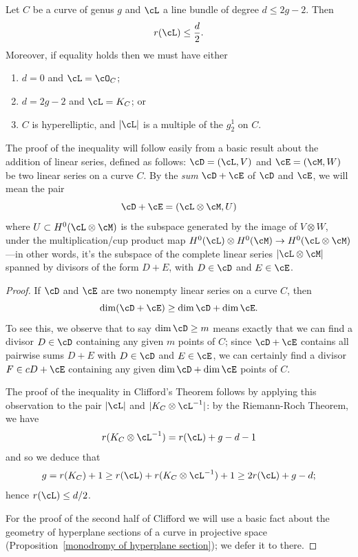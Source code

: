 \begin{theorem}\label{Clifford}
Let $C$ be a curve of genus $g$ and $\cL$ a line bundle of degree $d \leq 2g-2$. Then
$$
r(\cL) \leq \frac{d}{2}.
$$
Moreover, if  equality holds then we must have either
\begin{enumerate}
\item $d=0$ and $\cL = \cO_C$;
\item $d = 2g-2$ and $\cL = K_C$; or
\item $C$ is hyperelliptic, and $|\cL|$ is a multiple of the $g^1_2$ on $C$.
\end{enumerate}
\end{theorem}

The proof of the inequality will follow easily from a basic result about the addition of linear series, defined as follows:
$\cD = (\cL,V)$ and $\cE = (\cM, W)$ be two linear series on a curve $C$. By the \emph{sum} $\cD + \cE$ of $\cD$ and $\cE$, we will mean the pair 
$$
\cD + \cE = (\cL \otimes \cM, U) 
$$
where $U \subset H^0(\cL \otimes \cM)$ is the subspace generated by the image of $V \otimes W$, under the multiplication/cup product map $H^0(\cL) \otimes H^0(\cM) \to H^0(\cL \otimes \cM)$---in other words, it's the subspace of the complete linear series $|\cL\otimes \cM|$ spanned by divisors of the form $D+E$, with $D \in \cD$ and $E \in \cE$.
 
\begin{proof}
If $\cD$ and $\cE$ are two nonempty linear series on a curve $C$, then
$$
\dim(\cD + \cE) \geq \dim \cD + \dim \cE.
$$
To see this, we observe that to say $\dim \cD \geq m$ means exactly that we can find a divisor $D \in \cD$ containing any given $m$ points of $C$; since $\cD + \cE$ contains all pairwise sums $D + E$ with $D \in \cD$ and $E \in \cE$, we can certainly find a divisor $F \in cD + \cE$ containing any given $\dim \cD + \dim \cE$ points of $C$.

The proof of the inequality in Clifford's Theorem follows  by applying this observation to the pair $|\cL|$ and $|K_C\otimes \cL^{-1}|$: by 
the Riemann-Roch Theorem, we have
$$
r(K_C\otimes \cL^{-1}) = r(\cL) +g - d - 1
$$
and so we deduce that
$$
g = r(K_C) + 1 \geq r(\cL) + r(K_C\otimes \cL^{-1}) + 1 \geq 2r(\cL) +g - d;
$$
hence $r(\cL) \leq d/2$.

For the proof of the second half of Clifford we will use a basic fact about the geometry of hyperplane sections of a curve in projective space (Proposition~\ref{monodromy of hyperplane section}); we defer it to there.
\end{proof}



